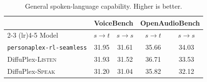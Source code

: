 \begin{table}[t]
\caption{
General spoken-language capability. Higher is better.
}
\label{tab:general_results}
\centering
\small
\setlength{\tabcolsep}{4.5pt}
\renewcommand{\arraystretch}{1.05}
\begin{tabular}{lcccc}
\toprule
& \multicolumn{2}{c}{VoiceBench}
& \multicolumn{2}{c}{OpenAudioBench} \\
\cmidrule(lr){2-3}
\cmidrule(lr){4-5}
Model
& $s{\rightarrow}t$
& $s{\rightarrow}s$
& $s{\rightarrow}t$
& $s{\rightarrow}s$ \\
\midrule
\texttt{personaplex-rl-seamless}
& 31.95 & 31.61
& 35.66 & 34.03 \\

DiffuPlex-\textsc{Listen}
& 31.93 & 31.52
& 36.71 & 33.53 \\

DiffuPlex-\textsc{Speak}
& 31.20 & 31.04
& 35.82 & 32.12 \\
\bottomrule
\end{tabular}
\end{table}